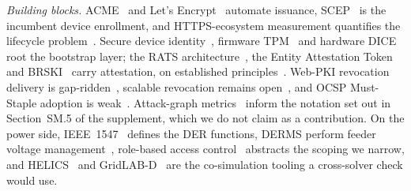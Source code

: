 \emph{Building blocks.} ACME~\cite{rfc8555} and Let's Encrypt~\cite{aas2019letsencrypt} automate
issuance, SCEP~\cite{rfc8894} is the incumbent device enrollment, and HTTPS-ecosystem measurement
quantifies the lifecycle problem~\cite{durumeric2013analysis}. Secure device
identity~\cite{ieee8021ar2018}, firmware TPM~\cite{raj2016ftpm} and hardware
DICE~\cite{jager2020dice} root the bootstrap layer; the RATS architecture~\cite{rfc9334}, the
Entity Attestation Token~\cite{rfc9711} and BRSKI~\cite{rfc8995} carry attestation, on established
principles~\cite{coker2011principles}. Web-PKI revocation delivery is
gap-ridden~\cite{liu2015endtoend}, scalable revocation remains
open~\cite{larisch2017crlite,smith2020letsrevoke}, and OCSP Must-Staple adoption is
weak~\cite{chung2018ocsp}. Attack-graph metrics~\cite{ou2005mulval,ammann2002scalable,
jajodia2005topological,wang2008attackgraph,frigault2008measuring,poolsappasit2012dynamic,
wang2014kzero} inform the notation set out in Section~SM.5 of the supplement, which we do not claim
as a contribution. On the power side, IEEE~1547~\cite{ieee1547-2018} defines the DER functions, DERMS
perform feeder voltage management~\cite{rahman2021derms}, role-based access
control~\cite{sandhu1996rbac} abstracts the scoping we narrow, and HELICS~\cite{hardy2024helics,
palmintier2017helics} and GridLAB-D~\cite{chassin2008gridlabd} are the co-simulation tooling a
cross-solver check would use.

